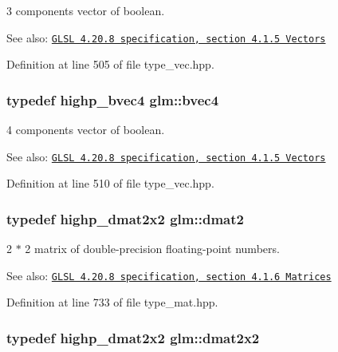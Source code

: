 3 components vector of boolean.

\begin{Desc}
\item[See also:]\href{http://www.opengl.org/registry/doc/GLSLangSpec.4.20.8.pdf}{\tt GLSL 4.20.8 specification, section 4.1.5 Vectors} \end{Desc}


Definition at line 505 of file type\_\-vec.hpp.\hypertarget{group__core__types_g6bb211b3d3bebae3867548d5673ca5cd}{
\subsubsection[bvec4]{\setlength{\rightskip}{0pt plus 5cm}typedef highp\_\-bvec4 {\bf glm::bvec4}}}
\label{group__core__types_g6bb211b3d3bebae3867548d5673ca5cd}


4 components vector of boolean.

\begin{Desc}
\item[See also:]\href{http://www.opengl.org/registry/doc/GLSLangSpec.4.20.8.pdf}{\tt GLSL 4.20.8 specification, section 4.1.5 Vectors} \end{Desc}


Definition at line 510 of file type\_\-vec.hpp.\hypertarget{group__core__types_gd8c130d26c4cd9a1a831c1a74292a8f6}{
\subsubsection[dmat2]{\setlength{\rightskip}{0pt plus 5cm}typedef highp\_\-dmat2x2 {\bf glm::dmat2}}}
\label{group__core__types_gd8c130d26c4cd9a1a831c1a74292a8f6}


2 $\ast$ 2 matrix of double-precision floating-point numbers.

\begin{Desc}
\item[See also:]\href{http://www.opengl.org/registry/doc/GLSLangSpec.4.20.8.pdf}{\tt GLSL 4.20.8 specification, section 4.1.6 Matrices} \end{Desc}


Definition at line 733 of file type\_\-mat.hpp.\hypertarget{group__core__types_ge9932771e11a4f38e21f1136423bab18}{
\subsubsection[dmat2x2]{\setlength{\rightskip}{0pt plus 5cm}typedef highp\_\-dmat2x2 {\bf glm::dmat2x2}}}
\label{group__core__types_ge9932771e11a4f38e21f1136423bab18}



